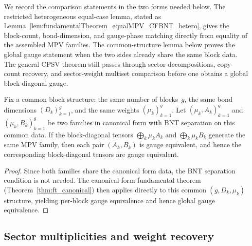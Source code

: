 We record the comparison statements in the two forms needed below. The
restricted heterogeneous equal-case lemma, stated as
Lemma~\ref{lem:fundamentalTheorem_equalMPV_CFBNT_hetero}, gives the
block-count, bond-dimension, and gauge-phase matching directly from equality of
the assembled MPV families. The common-structure lemma below proves the
global gauge statement when the two sides already share the same block data.
The general CPSV theorem still passes through sector decompositions, copy-count
recovery, and sector-weight multiset comparison before one obtains a global
block-diagonal gauge.

\begin{lemma}\label{lem:ft_equal_same_structure}
	\leanok
	Fix a common block structure: the same number of blocks~$g$,
	the same bond dimensions $(D_k)_{k=1}^g$, and the same weights
	$(\mu_k)_{k=1}^g$.
	Let $(\mu_k, A_k)_{k=1}^g$ and $(\mu_k, B_k)_{k=1}^g$ be two families in
	canonical form with BNT separation on this common data.
	If the block-diagonal tensors
	$\bigoplus_k \mu_k A_k$ and $\bigoplus_k \mu_k B_k$
	generate the same MPV family, then each pair $(A_k, B_k)$ is
	gauge equivalent, and hence the corresponding block-diagonal tensors
	are gauge equivalent.
\end{lemma}

\begin{proof}
	\leanok
	Since both families share the canonical form data, the BNT separation
	condition is not needed.
	The canonical-form fundamental theorem
	(Theorem~\ref{thm:ft_canonical}) then applies directly to this
	common $(g, D_k, \mu_k)$ structure, yielding per-block gauge
	equivalence and hence global gauge equivalence.
\end{proof}

\subsection{Sector multiplicities and weight recovery}%
\label{sec:route_b}

